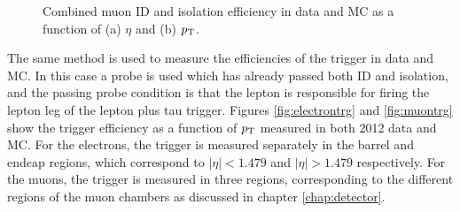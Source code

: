 \begin{figure}[htb]
\caption[Combined muon ID and isolation efficiency in data and MC as a function
of (a) $\eta$ and (b) $\pt$.]
{Combined muon ID and isolation efficiency in data and \ac{MC} as a function
of (a) $\eta$ and (b) $\pt$.}
\label{fig:muonIdIso}
\end{figure}

The same method is used to measure the efficiencies of the trigger
in data and \ac{MC}. In this case a probe is used which has already passed both ID
and isolation, and the passing probe condition is that the lepton is responsible
for firing the lepton leg of the lepton plus tau trigger. Figures
\ref{fig:electrontrg} and \ref{fig:muontrg} show the trigger efficiency as a
function of $\pt$ measured in both 2012 data and \ac{MC}. For the
electrons, the trigger is measured separately in the barrel and endcap
regions, which correspond to $|\eta| < 1.479$ and $|\eta| > 1.479$
respectively. For the muons, the trigger is measured in three regions, corresponding
to the different regions of the muon chambers as discussed in chapter
\ref{chap:detector}.

